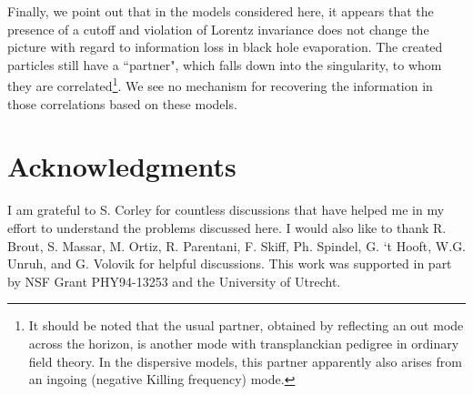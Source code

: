 \documentclass[12pt]{article}
\begin{document}
Finally, we point out that in the models considered here, it appears
that the presence of a cutoff and violation of Lorentz invariance does
not change the picture with regard to information loss in black hole
evaporation. The created particles still have a ``partner"\cite{BMPS},
which falls down into the singularity, to whom they are
correlated\footnote{It should be noted that the usual partner,
obtained\cite{Unruh-notes} by reflecting an out mode across the
horizon, is another mode with transplanckian pedigree in ordinary field
theory.  In the dispersive models, this partner apparently\cite{BMPS}
also arises from an ingoing (negative Killing frequency) mode.}.  We
see no mechanism for recovering the information in those correlations
based on these models.

\section{Acknowledgments} 
I am grateful to S. Corley for countless
discussions that have helped me in my effort to understand the problems
discussed here. I would also like to thank R. Brout, S. Massar, M.
Ortiz, R. Parentani, F. Skiff, Ph. Spindel, G. `t Hooft, W.G. Unruh,
and G. Volovik
for helpful discussions. This work was supported in part by NSF Grant
PHY94-13253 and the University of Utrecht.
\end{document}
